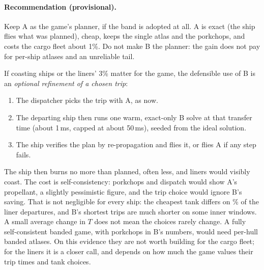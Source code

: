 \documentclass[10pt,a4paper]{article}
\begin{document}
\begin{table}[h]\centering\small
\caption{The refinement policy on the base-tank departures where A flies. Fuel: A's extra propellant over the
policy at A's shortest full-tank time. Cost: A's extra trip cost over the policy on A's cheapest trip (same time
and load). Means with fallback (a failed policy solve counts as zero). ``full B'': A's extra cost over the full
banded optimum (with fallback), which may change the time. p99: 99th percentile of one policy solve with its check.}
\label{tab:policy}
\tabpolicy
\end{table}

\paragraph{Recommendation (provisional).} Keep A as the game's planner, if the band is adopted at all. A is exact (the ship
flies what was planned), cheap, keeps the single atlas and the porkchops, and costs the cargo fleet about 1\%. Do
not make B the planner: the gain does not pay for per-ship atlases and an unreliable tail.

If coasting ships or the liners' 3\% matter for the game, the defensible use of B is an \emph{optional refinement
of a chosen trip}:
\begin{enumerate}
\item The dispatcher picks the trip with A, as now.
\item The departing ship then runs one warm, exact-only B solve at that transfer time (about 1\,ms, capped at
  about 50\,ms), seeded from the ideal solution.
\item The ship verifies the plan by re-propagation and flies it, or flies A if any step fails.
\end{enumerate}
The ship then burns no more than planned, often less, and liners would visibly coast. The cost is self-consistency:
porkchops and dispatch would show A's propellant, a slightly pessimistic figure, and the trip choice would ignore
B's saving. That is not negligible for every ship: the cheapest tank differs on \tankDiffLinerPct\% of the liner
departures, and B's shortest trips are much shorter on some inner windows. A small average change in $T$ does not
mean the choices rarely change. A fully self-consistent banded game, with porkchops in B's numbers, would need
per-hull banded atlases. On this evidence they are not worth building for the cargo fleet; for the liners it is a
closer call, and depends on how much the game values their trip times and tank choices.
\end{document}
